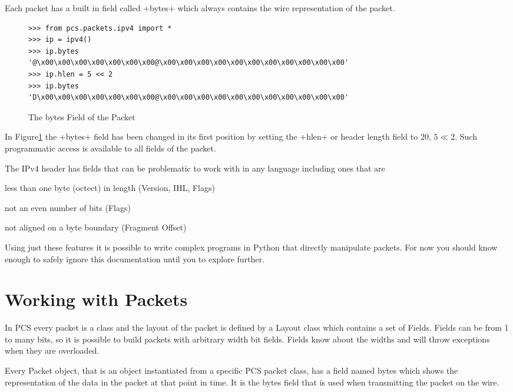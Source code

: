 \documentclass[11pt]{article}
\begin{document}
Each packet has a built in field called \field+bytes+ which always contains
the wire representation of the packet.  

\begin{figure}
  \centering
\begin{Verbatim}
>>> from pcs.packets.ipv4 import *
>>> ip = ipv4()
>>> ip.bytes
'@\x00\x00\x00\x00\x00\x00\x00@\x00\x00\x00\x00\x00\x00\x00\x00\x00\x00\x00'
>>> ip.hlen = 5 << 2
>>> ip.bytes
'D\x00\x00\x00\x00\x00\x00\x00@\x00\x00\x00\x00\x00\x00\x00\x00\x00\x00\x00'
\end{Verbatim}
  \caption{The bytes Field of the Packet}
  \label{fig:bytes-field}
\end{figure}

In Figure\ref{fig:bytes-field} the \field+bytes+ field has been
changed in its first position by setting the \field+hlen+ or header
length field to 20, $5 \ll 2$.  Such programmatic access is available
to all fields of the packet.

The IPv4 header has fields that can be problematic to work with in any
language including ones that are

\begin{list}{fig:ipheadfeatures}{}
\item less than one byte (octect) in length (Version, IHL, Flags)
\item not an even number of bits (Flags)
\item not aligned on a byte boundary (Fragment Offset)
\end{list}

Using just these features it is possible to write complex programs in
Python that directly manipulate packets.  For now you should know
enough to safely ignore this documentation until you to explore further.

\section{Working with Packets}

In PCS every packet is a class and the layout of the packet is defined
by a Layout class which contains a set of Fields.  Fields can be from
1 to many bits, so it is possible to build packets with arbitrary
width bit fields.  Fields know about the widths and will throw
exceptions when they are overloaded.

Every Packet object, that is an object instantiated from a specific
PCS packet class, has a field named bytes which shows the
representation of the data in the packet at that point in time.  It is
the bytes field that is used when transmitting the packet on the wire.
\end{document}
